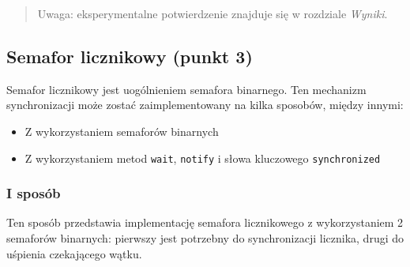 \documentclass[11pt]{article}
\providecommand{\tightlist}{%
      \setlength{\itemsep}{0pt}\setlength{\parskip}{0pt}}
\begin{document}
\begin{quote}
Uwaga: eksperymentalne potwierdzenie znajduje się w rozdziale
\emph{Wyniki}.
\end{quote}

    \hypertarget{semafor-licznikowy-punkt-3}{%
\subsection{Semafor licznikowy (punkt
3)}\label{semafor-licznikowy-punkt-3}}

Semafor licznikowy jest uogólnieniem semafora binarnego. Ten mechanizm
synchronizacji może zostać zaimplementowany na kilka sposobów, między
innymi:

\begin{itemize}
\tightlist
\item
  Z wykorzystaniem semaforów binarnych
\item
  Z wykorzystaniem metod \texttt{wait}, \texttt{notify} i słowa
  kluczowego \texttt{synchronized}
\end{itemize}

    \hypertarget{i-sposuxf3b}{%
\subsubsection{I sposób}\label{i-sposuxf3b}}

Ten sposób przedstawia implementację semafora licznikowego z
wykorzystaniem 2 semaforów binarnych: pierwszy jest potrzebny do
synchronizacji licznika, drugi do uśpienia czekającego wątku.
\end{document}
